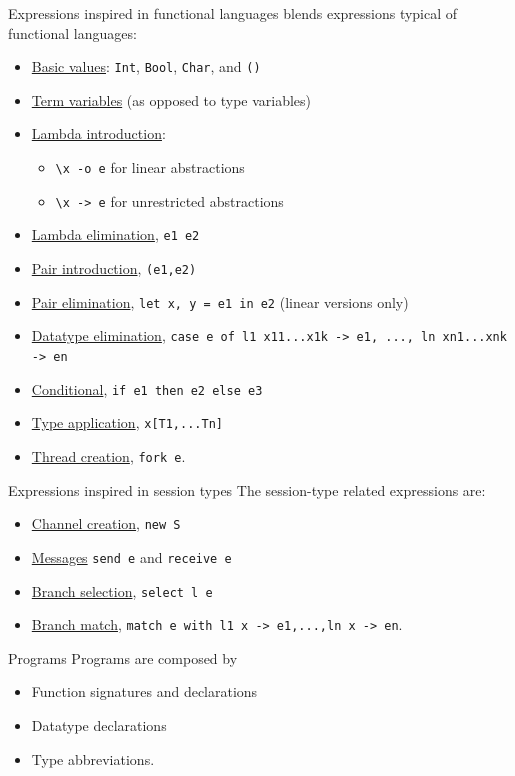 \documentclass[10pt]{beamer}
\begin{document}
\begin{frame}{Expressions {\small \color{mLightBrown}inspired in functional languages}}
\freest{} blends expressions typical of functional languages:
\begin{itemize}
\item \underline{Basic values}: \lstinline|Int|,
  \lstinline|Bool|, \lstinline|Char|, and \lstinline|()|
\item \underline{Term variables} (as opposed to type variables)
\item \underline{Lambda introduction}: 
\begin{itemize}
	\item \lstinline|\x -o e| for linear abstractions
	\item \lstinline|\x -> e| for unrestricted abstractions
\end{itemize}
\item \underline{Lambda elimination}, \lstinline|e1 e2|
\item \underline{Pair introduction}, \lstinline|(e1,e2)| 
\item \underline{Pair elimination},
  \lstinline|let x, y = e1 in e2| (linear versions only)
\item \underline{Datatype elimination},
  \lstinline|case e of l1 x11...x1k -> e1, ..., ln xn1...xnk -> en|
\item \underline{Conditional}, \lstinline|if e1 then e2 else e3|
\item \underline{Type application}, \lstinline|x[T1,...Tn]|
\item \underline{Thread creation}, \lstinline|fork e|.
\end{itemize}
\end{frame}

\begin{frame}{Expressions {\small \color{mLightBrown}inspired in session types}}
The session-type related expressions are:
\begin{itemize}
\item \underline{Channel creation}, \lstinline|new S|
\item \underline{Messages} \lstinline|send e| and
  \lstinline|receive e|
\item \underline{Branch selection}, \lstinline|select l e|
\item \underline{Branch match},
  \lstinline|match e with l1 x -> e1,...,ln x -> en|.
\end{itemize}
\end{frame}

\begin{frame}{Programs}
Programs are composed by
%
\begin{itemize}
\item Function signatures and
  declarations
\item Datatype declarations
\item Type abbreviations.
\end{itemize}
\end{frame}
\end{document}
